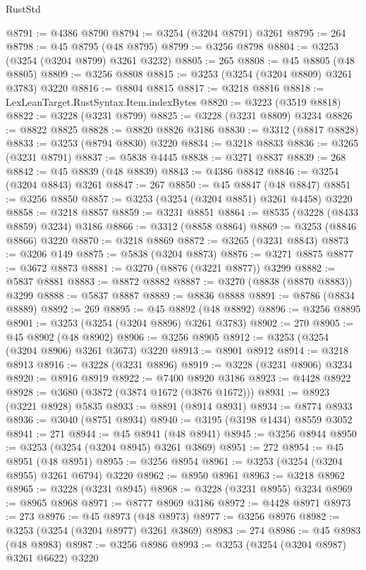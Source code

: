 \begin{lexlean}{RustStd}
\begin{coremodule}
{\begin{coremodule}
{{{{{{{{{{{{{{{{{{{{{{{{{{{{{{{{{{{{{@8791 := @4386 @8790
@8794 := @3254 (@3204 @8791) @3261
@8795 := 264
@8798 := @45 @8795 (@48 @8795)
@8799 := @3256 @8798
@8804 := @3253 (@3254 (@3204 @8799) @3261 @3232)
@8805 := 265
@8808 := @45 @8805 (@48 @8805)
@8809 := @3256 @8808
@8815 := @3253 (@3254 (@3204 @8809) @3261 @3783) @3220
@8816 := @8804 @8815
@8817 := @3218 @8816
@8818 := LexLeanTarget.RustSyntax.Item.indexBytes
@8820 := @3223 (@3519 @8818)
@8822 := @3228 (@3231 @8799)
@8825 := @3228 (@3231 @8809) @3234
@8826 := @8822 @8825
@8828 := @8820 @8826 @3186
@8830 := @3312 (@8817 @8828)
@8833 := @3253 (@8794 @8830) @3220
@8834 := @3218 @8833
@8836 := @3265 (@3231 @8791)
@8837 := @5838 @4445
@8838 := @3271 @8837
@8839 := 268
@8842 := @45 @8839 (@48 @8839)
@8843 := @4386 @8842
@8846 := @3254 (@3204 @8843) @3261
@8847 := 267
@8850 := @45 @8847 (@48 @8847)
@8851 := @3256 @8850
@8857 := @3253 (@3254 (@3204 @8851) @3261 @4458) @3220
@8858 := @3218 @8857
@8859 := @3231 @8851
@8864 := @8535 (@3228 (@8433 @8859) @3234) @3186
@8866 := @3312 (@8858 @8864)
@8869 := @3253 (@8846 @8866) @3220
@8870 := @3218 @8869
@8872 := @3265 (@3231 @8843)
@8873 := @3206 @149
@8875 := @5838 (@3204 @8873)
@8876 := @3271 @8875
@8877 := @3672 @8873
@8881 := @3270 (@8876 (@3221 @8877)) @3299
@8882 := @5837 @8881
@8883 := @8872 @8882
@8887 := @3270 (@8838 (@8870 @8883)) @3299
@8888 := @5837 @8887
@8889 := @8836 @8888
@8891 := @8786 (@8834 @8889)
@8892 := 269
@8895 := @45 @8892 (@48 @8892)
@8896 := @3256 @8895
@8901 := @3253 (@3254 (@3204 @8896) @3261 @3783)
@8902 := 270
@8905 := @45 @8902 (@48 @8902)
@8906 := @3256 @8905
@8912 := @3253 (@3254 (@3204 @8906) @3261 @3673) @3220
@8913 := @8901 @8912
@8914 := @3218 @8913
@8916 := @3228 (@3231 @8896)
@8919 := @3228 (@3231 @8906) @3234
@8920 := @8916 @8919
@8922 := @7400 @8920 @3186
@8923 := @4428 @8922
@8928 := @3680 (@3872 (@3874 @1672 (@3876 @1672)))
@8931 := @8923 (@3221 @8928) @5835
@8933 := @8891 (@8914 @8931)
@8934 := @8774 @8933
@8936 := @3040 (@8751 @8934)
@8940 := @3195 (@3198 @1434) @8559 @3052
@8941 := 271
@8944 := @45 @8941 (@48 @8941)
@8945 := @3256 @8944
@8950 := @3253 (@3254 (@3204 @8945) @3261 @3869)
@8951 := 272
@8954 := @45 @8951 (@48 @8951)
@8955 := @3256 @8954
@8961 := @3253 (@3254 (@3204 @8955) @3261 @6794) @3220
@8962 := @8950 @8961
@8963 := @3218 @8962
@8965 := @3228 (@3231 @8945)
@8968 := @3228 (@3231 @8955) @3234
@8969 := @8965 @8968
@8971 := @8777 @8969 @3186
@8972 := @4428 @8971
@8973 := 273
@8976 := @45 @8973 (@48 @8973)
@8977 := @3256 @8976
@8982 := @3253 (@3254 (@3204 @8977) @3261 @3869)
@8983 := 274
@8986 := @45 @8983 (@48 @8983)
@8987 := @3256 @8986
@8993 := @3253 (@3254 (@3204 @8987) @3261 @6622) @3220
}}}}}}}}}}}}}}}}}}}}}}}}}}}}}}}}}}}}}
\end{coremodule}}
\end{coremodule}
\end{lexlean}
